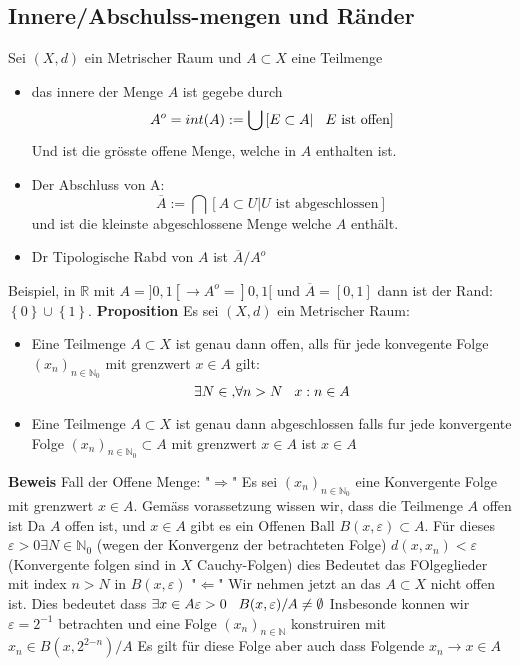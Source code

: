 \documentclass{article}
\newcommand{\mspc}{\hspace{0.3cm}}
\begin{document}
\subsection{Innere/Abschulss-mengen und Ränder}
Sei $(X,d)$ ein Metrischer Raum und $A\subset X$ eine Teilmenge
\begin{itemize}
\item{das innere der Menge $A$ ist gegebe durch \[A^o=int(A):=\bigcup\left[E\subset A|\mspc E \text{ ist offen}\right]\] Und ist die grösste offene Menge, welche in $A$ enthalten ist.}
\item{Der Abschluss von A:\[\overline{A}
:=\bigcap \left[A\subset U|U \text{ ist abgeschlossen}\right]\] und ist die kleinste abgeschlossene Menge welche $A$ enthält.}
\item{Dr Tipologische Rabd von $A$ ist $\overline{A}/A^o$}
\end{itemize}
Beispiel, in $\mathbb{R}$ mit $A=]0,1[\rightarrow A^o=]0,1[$ und $\overline{A}=[0,1]$ dann ist der Rand: $\left\lbrace 0\right\rbrace\cup\left\lbrace1\right\rbrace$.\newline
\textbf{Proposition} Es sei $(X,d)$ ein Metrischer Raum:
\begin{itemize}
\item{Eine Teilmenge $A\subset X$ ist genau dann offen, alls für jede konvegente Folge $(x_n)_{n\in\mathbb{N}_0}$ mit grenzwert $x\in A$ gilt:\[\exists N\in\mathbb, \forall n>N \mspc x:n\in A\]}
\item{Eine Teilmenge $A\subset X$ ist genau dann abgeschlossen falls fur jede konvergente Folge $(x_n)_{n\in\mathbb{N}_0}\subset A$ mit grenzwert $x\in A$ ist $x\in A$}
\end{itemize}
\textbf{Beweis} Fall der Offene Menge:\newline
"$\Rightarrow$" Es sei $(x_n)_{n\in\mathbb{N}_0 }$ eine Konvergente Folge mit grenzwert $x\in A$. Gemäss vorassetzung wissen wir, dass die Teilmenge $A$ offen ist Da $A$ offen ist, und $x\in A$ gibt es ein Offenen Ball $B(x,\varepsilon)\subset A$. Für dieses $\varepsilon>0 \exists N\in\mathbb{N}_0$ (wegen der Konvergenz der betrachteten Folge) $d(x,x_n)<\varepsilon$ (Konvergente folgen sind in $X$ Cauchy-Folgen) dies Bedeutet das FOlgeglieder 
mit index $n>N$ in $B(x,\varepsilon)$\newline
"$\Leftarrow$" Wir nehmen jetzt an das $A\subset X$ nicht offen ist. Dies bedeutet dass $\exists x\in A \varepsilon>0 \mspc B(x,\varepsilon)/A\neq\emptyset$
Insbesonde konnen wir $\varepsilon=2^{-1}$ betrachten und eine Folge $(x_n)_{n\in\mathbb{N}}$ konstruiren mit $x_n\in B(x,2^{2{-n}})/A$ Es gilt für diese Folge aber auch dass Folgende $x_n\rightarrow x\in A$ \newline
\end{document}
